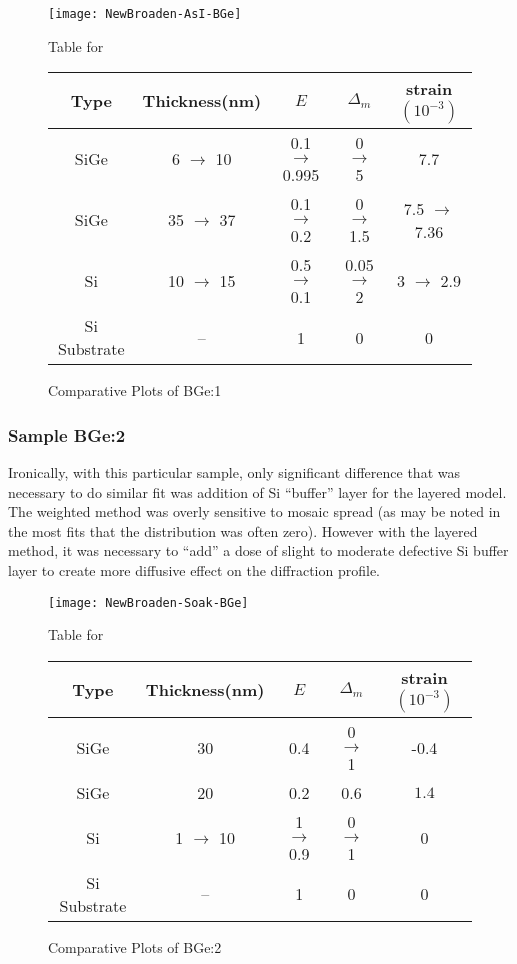 \begin{figure}[ht]%
\caption{Comparative Plots of  BGe:1}
\label{NBGe1:fig}
\begin{minipage}{\linewidth}
\texttt{[image: NewBroaden-AsI-BGe]}
\end{minipage}
\begin{minipage}{\linewidth}
\centering
\vspace{10pt}
Table for \\
\begin{tabular}[htbp]{@{}c|cccc@{}}
    \hline
  Type & Thickness(nm) & $E$ & $\Delta_m$ & strain $(10^{-3})$ \\
    \hline
  SiGe & 6 $\rightarrow$ 10 & 0.1 $\rightarrow$ 0.995 & 0 $\rightarrow$ 5 & 7.7   \\
  SiGe & 35 $\rightarrow$ 37& 0.1 $\rightarrow$ 0.2& 0 $\rightarrow$ 1.5 & 7.5 $\rightarrow$  7.36\\
  Si & 10 $\rightarrow$ 15& 0.5 $\rightarrow$ 0.1& 0.05 $\rightarrow$ 2 & 3 $\rightarrow$ 2.9 \\
    Si Substrate & -- & 1 & 0 & 0
  \end{tabular}
\end{minipage}
\end{figure}

\subsubsection{Sample BGe:2}

Ironically, with this particular sample, only significant difference that was necessary to do similar fit was addition of Si ``buffer'' layer for the layered model.  The weighted method was overly sensitive to mosaic spread (as may be noted in the most fits that the distribution was often zero).  However with the layered method, it was necessary to ``add'' a dose of slight to moderate defective Si buffer layer to create more diffusive effect on the diffraction profile.

\begin{figure}[ht]%
\caption{Comparative Plots of BGe:2}
\label{NBGe2:fig}
\begin{minipage}{\linewidth}
\texttt{[image: NewBroaden-Soak-BGe]}
\end{minipage}
\begin{minipage}{\linewidth}
\centering
\vspace{10pt}
Table for \\
\begin{tabular}[htbp]{@{}c|cccc@{}}
    \hline
  Type & Thickness(nm) & $E$ & $\Delta_m$ & strain $(10^{-3})$ \\
    \hline
  SiGe & 30 & 0.4  & 0 $\rightarrow$ 1& -0.4  \\
  SiGe & 20 & 0.2  &  0.6& $1.4 $  \\
Si	&1 $\rightarrow$ 10 & 1 $\rightarrow$0.9  &   0 $\rightarrow$ 1 & 0\\
  Si Substrate & -- & 1 & 0 & 0
  \end{tabular}
\end{minipage}
\end{figure}

